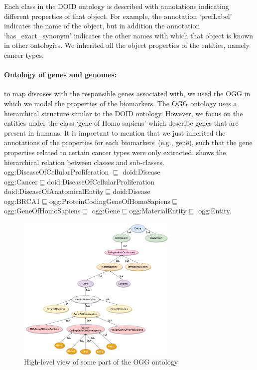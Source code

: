\hspace*{3.5mm} Each class in the DOID ontology is described with annotations indicating different properties of that object. For example, the annotation `prefLabel' indicates the name of the object, but in addition the annotation `has\_exact\_synonym' indicates the other names with which that object is known in other ontologies. We inherited all the object properties of the entities, namely cancer types.

\paragraph{Ontology of genes and genomes:} \hspace*{-2.5mm} to map diseases with the responsible genes associated with, we used the OGG in which we model the properties of the biomarkers. The OGG ontology uses a hierarchical structure similar to the DOID ontology. However, we focus on the entities under the class `gene of Homo sapiens' which describe genes that are present in humans. It is important to mention that we just inherited the annotations of the properties for each biomarkers~(e.g., gene), such that the gene properties related to certain cancer types were only extracted.  shows the hierarchical relation between classes and sub-classes.\\

\vspace{-4mm}
{\scriptsize \noindent ogg:DiseaseOfCellularProliferation $\sqsubseteq$ doid:Disease\\
ogg:Cancer$\sqsubseteq$doid:DiseaseOfCellularProliferation\\
doid:DiseaseOfAnatomicalEntity$\sqsubseteq$doid:Disease\\
ogg:BRCA1$\sqsubseteq$ogg:ProteinCodingGeneOfHomoSapiens$\sqsubseteq$ogg:GeneOfHomoSapiens$\sqsubseteq$ ogg:Gene$\sqsubseteq$ogg:MaterialEntity$\sqsubseteq$ ogg:Entity.}\\

\vspace{-2mm}
\begin{figure}
	\centering
	\includegraphics[width=0.7\linewidth,height=70mm]{images/go.png}
	\caption{High-level view of some part of the OGG ontology} 
	\label{fig:ogg_ontology}
	\vspace{-2mm}
\end{figure}

